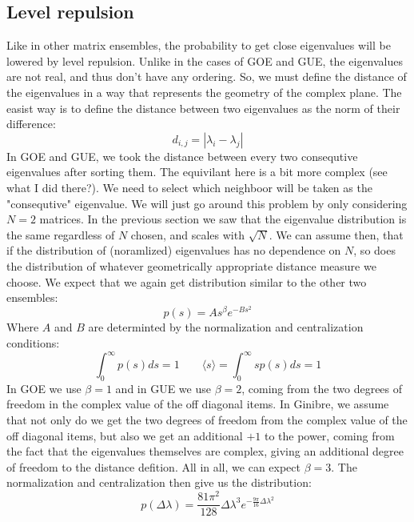 \documentclass{article}
\begin{document}
\subsection{Level repulsion}
Like in other matrix ensembles, the probability to get close eigenvalues will be lowered by level repulsion. Unlike in the cases of GOE and GUE, the eigenvalues are not real, and thus don't have any ordering. So, we must define the distance of the eigenvalues in a way that represents the geometry of the complex plane. The easist way is to define the distance between two eigenvalues as the norm of their difference:
\begin{equation}
    d_{i,j} = \left|\lambda_i - \lambda_j\right|
\end{equation}
In GOE and GUE, we took the distance between every two consequtive eigenvalues after sorting them. The equivilant here is a bit more complex (see what I did there?). We need to select which neighboor will be taken as the "consequtive" eigenvalue.
\newline
We will just go around this problem by only considering $N = 2$ matrices. In the previous section we saw that the eigenvalue distribution is the same regardless of $N$ chosen, and scales with $\sqrt{N}$. We can assume then, that if the distribution of (noramlized) eigenvalues has no dependence on $N$, so does the distribution of whatever geometrically appropriate distance measure we choose.
\newline
We expect that we again get distribution similar to the other two ensembles:
\begin{equation}
    p(s) = A s^\beta e^{-B s^2} 
\end{equation}
Where $A$ and $B$ are determinted by the normalization and centralization conditions:
\begin{equation}
    \int_0^\infty p(s) ds = 1 \qquad \langle s \rangle = \int_0^\infty sp(s) ds = 1
\end{equation}
In GOE we use $\beta = 1$ and in GUE we use $\beta = 2$, coming from the two degrees of freedom in the complex value of the off diagonal items. In Ginibre, we assume that not only do we get the two degrees of freedom from the complex value of the off diagonal items, but also we get an additional $+1$ to the power, coming from the fact that the eigenvalues themselves are complex, giving an additional degree of freedom to the distance defition. All in all, we can expect $\beta = 3$. The normalization and centralization then give us the distribution:
\begin{equation}
    p(\Delta \lambda) = \frac{81\pi^2}{128} \Delta \lambda^3 e^{-\frac{9\pi}{16}\Delta \lambda^2}
\end{equation}
\end{document}
